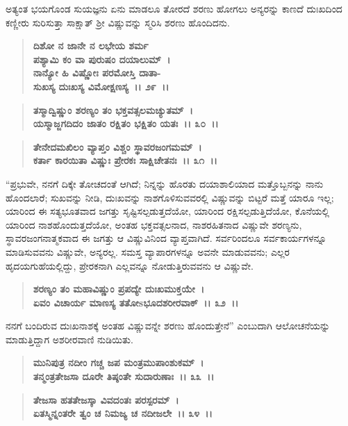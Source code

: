 ಅತ್ಯಂತ ಭಯಗೊಂಡ ಸುಯಜ್ಞನು ಏನು ಮಾಡಲೂ ತೋರದೆ ಶರಣು ಹೋಗಲು ಅನ್ಯರನ್ನು ಕಾಣದೆ ದುಃಖದಿಂದ ಕಣ್ಣೀರು ಸುರಿಸುತ್ತಾ ಸಾಕ್ಷಾತ್ ಶ‍್ರೀ ವಿಷ್ಣುವನ್ನು ಸ್ಮರಿಸಿ ಶರಣು ಹೊಂದಿದನು.

\begin{verse}
\textbf{ದಿಶೋ ನ ಜಾನೇ ನ ಲಭೇಯ ಶರ್ಮ} \\\textbf{ಪಶ್ಯಾಮಿ ಕಂ ವಾ ಪುರುಷಂ ದಯಾಲುಮ್~।}\\\textbf{ನಾನ್ಯೋ ಹಿ ವಿಷ್ಣೋಃ ಪರಮೋಸ್ತಿ ದಾತಾ-} \\\textbf{ಸುಖಸ್ಯ ದುಃಖಸ್ಯ ವಿಮೋಕ್ಷಣಸ್ಯ~।। ೨೯~।। }
\end{verse}

\begin{verse}
\textbf{ತಸ್ಮಾದ್ವಿಷ್ಣುಂ ಶರಣ್ಯಂ ತಂ ಭಕ್ತವತ್ಸಲಮಚ್ಯುತಮ್~।}\\\textbf{ಯಸ್ಮಾಜ್ಜಗದಿದಂ ಜಾತಂ ರಕ್ಷಿತಂ ಭಕ್ಷಿತಂ ಯತಃ~।। ೩೦~।।} 
\end{verse}

\begin{verse}
\textbf{ತೇನೇದಮಖಿಲಂ ವ್ಯಾಪ್ತಂ ವಿಶ್ಚಂ ಸ್ಥಾವರಜಂಗಮಮ್~।}\\\textbf{ಕರ್ತಾ ಕಾರಯಿತಾ ವಿಷ್ಣುಃ ಪ್ರೇರಕಃ ಸಾಕ್ಷಿಚೇತನಃ~।। ೩೧~।।}
\end{verse}

“ಪ್ರಭುವೇ, ನನಗೆ ದಿಕ್ಕೇ ತೋಚದಂತೆ ಆಗಿದೆ; ನಿನ್ನನ್ನು ಹೊರತು ದಯಾಶಾಲಿಯಾದ ಮತ್ತೊಬ್ಬನನ್ನು ನಾನು ಹೊಂದಲಾರೆ; ಸುಖವನ್ನು ನೀಡಿ, ದುಃಖವನ್ನು ನಾಶಗೊಳಿಸುವವರಲ್ಲಿ ವಿಷ್ಣುವನ್ನು ಬಿಟ್ಟರೆ ಮತ್ತೆ ಯಾರೂ ಇಲ್ಲ; ಯಾರಿಂದ ಈ ಸತ್ಯಭೂತವಾದ ಜಗತ್ತು ಸೃಷ್ಟಿಸಲ್ಪಡುತ್ತದೆಯೋ, ಯಾರಿಂದ ರಕ್ಷಿಸಲ್ಪಡುತ್ತಿದೆಯೋ, ಕೊನೆಯಲ್ಲಿ ಯಾರಿಂದ ನಾಶಹೊಂದುತ್ತದೆಯೋ, ಅಂತಹ ಭಕ್ತವತ್ಸಲನಾದ, ನಾಶರಹಿತನಾದ ವಿಷ್ಣುವೇ ಶರಣ್ಯನು, ಸ್ಥಾವರಜಂಗನಾತ್ಮಕವಾದ ಈ ಜಗತ್ತು ಆ ವಿಷ್ಣುವಿನಿಂದ ವ್ಯಾಪ್ತವಾಗಿದೆ. ಸರ್ವರಿಂದಲೂ ಸರ್ವಕಾರ್ಯಗಳನ್ನೂ ಮಾಡಿಸುವವನು ವಿಷ್ಣುವೇ, ಅನ್ಯರಲ್ಲ. ಸಮಸ್ತ ವ್ಯಾಪಾರಗಳನ್ನೂ ಅವನೇ ಮಾಡುವವನು; ಎಲ್ಲರ ಹೃದಯಗುಹೆಯಲ್ಲಿದ್ದು, ಪ್ರೇರಕನಾಗಿ ಎಲ್ಲವನ್ನೂ ನೋಡುತ್ತಿರುವವನು ಆ ವಿಷ್ಣುವೇ.

\begin{verse}
\textbf{ಶರಣ್ಯಂ ತಂ ಮಹಾವಿಷ್ಣುಂ ಪ್ರಪದ್ಯೇ ದುಃಖಮುಕ್ತಯೇ~।}\\\textbf{ಏವಂ ವಿಚಾರ್ಯ ಮಾಣಸ್ಯ ತತೋsಭೂದಶರೀರವಾಕ್~।। ೩೨~।।}
\end{verse}

ನನಗೆ ಬಂದಿರುವ ದುಃಖನಾಶಕ್ಕೆ ಅಂತಹ ವಿಷ್ಣುವನ್ನೇ ಶರಣು ಹೊಂದುತ್ತೇನೆ'' ಎಂಬುದಾಗಿ ಆಲೋಚನೆಯನ್ನು ಮಾಡುತ್ತಿದ್ದಾಗ ಅಶರೀರವಾಣಿ ನುಡಿಯಿತು.

\begin{verse}
\textbf{ಮುನಿಪುತ್ರ ನದೀಂ ಗಚ್ಚ ಜಪ ಮಂತ್ರಮುಪಾಂಶುಕಮ್~।}\\\textbf{ತನ್ಮಂತ್ರತೇಜಸಾ ದೂರೇ ತಿಷ್ಠಂತೇ ಸುದಾರುಣಾಃ~।। ೩೩~।। }
\end{verse}

\begin{verse}
\textbf{ತೇಜಸಾ ಹತತೇಜಸ್ಕಾ ವಿವದಂತಃ ಪರಸ್ಪರಮ್~।}\\\textbf{ಏತಸ್ಮಿನ್ನಂತರೇ ತ್ವಂ ಚ ನಿಮಜ್ಯ ಚ ನದೀಜಲೇ~।। ೩೪~।।} 
\end{verse}

